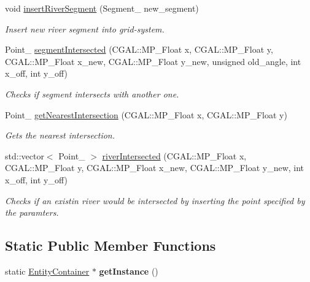 \begin{DoxyCompactItemize}
void \hyperlink{class_entity_container_a34870620ebef8b20c7685e03e5fde022}{insert\+River\+Segment} (Segment\+\_ new\+\_\+segment)
\begin{DoxyCompactList}\small\item\em Insert new river segment into grid-\/system. \end{DoxyCompactList}\item 
Point\+\_ \hyperlink{class_entity_container_a1e1faca63c2c26689c6d49b42edb1792}{segment\+Intersected} (C\+G\+A\+L\+::\+M\+P\+\_\+\+Float x, C\+G\+A\+L\+::\+M\+P\+\_\+\+Float y, C\+G\+A\+L\+::\+M\+P\+\_\+\+Float x\+\_\+new, C\+G\+A\+L\+::\+M\+P\+\_\+\+Float y\+\_\+new, unsigned old\+\_\+angle, int x\+\_\+off, int y\+\_\+off)
\begin{DoxyCompactList}\small\item\em Checks if segment intersects with another one. \end{DoxyCompactList}\item 
Point\+\_ \hyperlink{class_entity_container_a784de18b1f33fa8badc79fc369d29935}{get\+Nearest\+Intersection} (C\+G\+A\+L\+::\+M\+P\+\_\+\+Float x, C\+G\+A\+L\+::\+M\+P\+\_\+\+Float y)
\begin{DoxyCompactList}\small\item\em Gets the nearest intersection. \end{DoxyCompactList}\item 
std\+::vector$<$ Point\+\_ $>$ \hyperlink{class_entity_container_a652c1d48db6052d1d8dd5e1aa5c5eb5f}{river\+Intersected} (C\+G\+A\+L\+::\+M\+P\+\_\+\+Float x, C\+G\+A\+L\+::\+M\+P\+\_\+\+Float y, C\+G\+A\+L\+::\+M\+P\+\_\+\+Float x\+\_\+new, C\+G\+A\+L\+::\+M\+P\+\_\+\+Float y\+\_\+new, int x\+\_\+off, int y\+\_\+off)
\begin{DoxyCompactList}\small\item\em Checks if an existin river would be intersected by inserting the point specified by the paramters. \end{DoxyCompactList}\end{DoxyCompactItemize}
\subsection*{Static Public Member Functions}
\begin{DoxyCompactItemize}
\item 
\hypertarget{class_entity_container_a5b91deaecedcddb382a133904cd1629b}{}\label{class_entity_container_a5b91deaecedcddb382a133904cd1629b} 
static \hyperlink{class_entity_container}{Entity\+Container} $\ast$ {\bfseries get\+Instance} ()
\end{DoxyCompactItemize}

